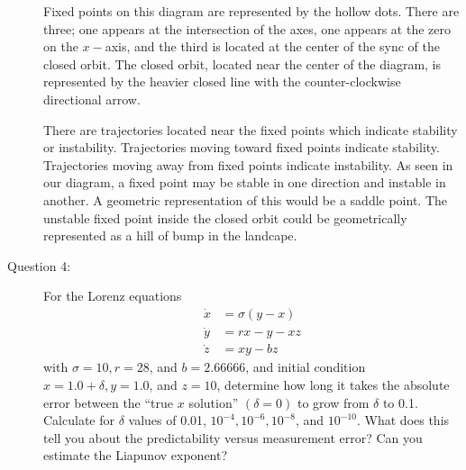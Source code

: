 \documentclass[letterpaper,10pt]{article}
\begin{document}
\begin{description}
Fixed points on this diagram are represented by the hollow dots. There are three; one appears at the intersection of the axes, one appears at the zero on the $x-$axis, and the third is located at the center of the sync of the closed orbit.  The closed orbit, located near the center of the diagram, is represented by the heavier closed line with the counter-clockwise directional arrow.

There are trajectories located near the fixed points which indicate stability or instability.  Trajectories moving toward fixed points indicate stability.  Trajectories moving away from fixed points indicate instability.  As seen in our diagram, a fixed point may be stable in one direction and instable in another.  A geometric representation of this would be a saddle point.  The unstable fixed point inside the closed orbit could be geometrically represented as a hill of bump in the
landcape.

\item[Question 4:]
For the Lorenz equations
\begin{align*}
\dot{x} &= \sigma(y-x) \\
\dot{y} &= rx-y-xz \\
\dot{z} &= xy-bz
\end{align*}
with $\sigma=10, r=28$, and $b=2.66666$, and initial condition $x=1.0+\delta, y=1.0$, and $z=10$, determine how long it takes the absolute error between the ``true $x$ solution'' $(\delta=0)$ to grow from $\delta$ to 0.1. Calculate for $\delta$ values of 0.01, $10^{-4}, 10^{-6}, 10^{-8}$, and $10^{-10}$.  What does this tell you about the predictability versus measurement error?  Can you estimate the Liapunov exponent?



\end{description}
\end{document}
